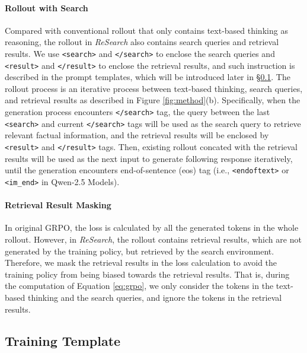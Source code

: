 \documentclass{article}
\begin{document}
\paragraph{Rollout with Search}
Compared with conventional rollout that only contains text-based thinking as reasoning, the rollout in \textit{ReSearch} also contains search queries and retrieval results.
We use \texttt{<search>} and \texttt{</search>} to enclose the search queries and \texttt{<result>} and \texttt{</result>} to enclose the retrieval results, and such instruction is described in the prompt templates, which will be introduced later in \S \ref{sec:method-template}.
The rollout process is an iterative process between text-based thinking, search queries, and retrieval results as described in Figure \ref{fig:method}(b). Specifically, when the generation process encounters \texttt{</search>} tag, the query between the last \texttt{<search>} and current \texttt{</search>} tags will be used as the search query to retrieve relevant factual information, and the retrieval results will be enclosed by \texttt{<result>} and \texttt{</result>} tags. Then, existing rollout concated with the retrieval results will be used as the next input to generate following response iteratively, until the generation encounters end-of-sentence (eos) tag (i.e., \texttt{<endoftext>} or \texttt{<im\_end>} in Qwen-2.5 Models).

\paragraph{Retrieval Result Masking}
In original GRPO, the loss is calculated by all the generated tokens in the whole rollout.
However, in \textit{ReSearch}, the rollout contains retrieval results, which are not generated by the training policy, but retrieved by the search environment.
Therefore, we mask the retrieval results in the loss calculation to avoid the training policy from being biased towards the retrieval results.
That is, during the computation of Equation \ref{eq:grpo}, we only consider the tokens in the text-based thinking and the search queries, and ignore the tokens in the retrieval results.

\subsection{Training Template}
\label{sec:method-template}
\end{document}
